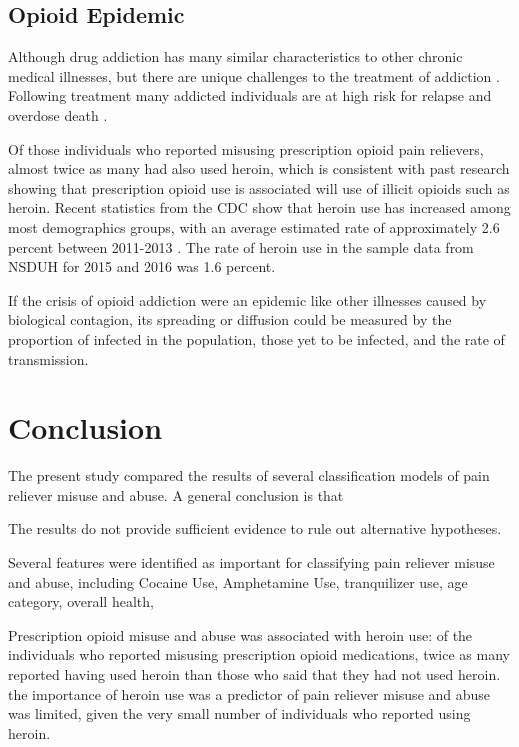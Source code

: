 \documentclass[sigconf]{acmart}
\begin{document}
\subsection{Opioid Epidemic}

Although drug addiction has many similar characteristics 
to other chronic medical illnesses, but there are unique challenges to the 
treatment of addiction \cite{marsch12, swendson16}. 
Following treatment many addicted individuals are at high 
risk for relapse and overdose death \cite{shaham03}.

Of those individuals who reported misusing prescription opioid pain relievers, 
almost twice as many had also used heroin, which is  consistent with past
research showing that prescription opioid use is associated will use of illicit 
opioids such as heroin. Recent statistics from the CDC show that heroin use has 
increased among most demographics groups, with an average estimated rate  of 
approximately 2.6 percent between 2011-2013 \cite{cdc16}. The rate of heroin use
in the sample data from NSDUH for 2015 and 2016 was 1.6 percent. 

If the crisis of opioid addiction were an epidemic like other illnesses caused 
by biological contagion, its spreading or diffusion could be measured by the 
proportion of infected in the population, those yet to be infected, and the 
rate of transmission. 

\section{Conclusion}

The present study compared the results of several classification models of 
pain reliever misuse and abuse. A general conclusion is that 

The results do not provide sufficient evidence to rule out alternative hypotheses. 

Several features were identified as important for classifying pain reliever
misuse and abuse, including Cocaine Use, Amphetamine Use, tranquilizer use,
age category, overall health,

Prescription opioid misuse and abuse was associated with heroin use: of 
the individuals who reported misusing prescription opioid medications, twice 
as many reported having used heroin than those who said that they had not used 
heroin. the importance of heroin use was a predictor of pain reliever misuse and
abuse was limited, given the very small number of individuals who reported 
using heroin.
\end{document}
